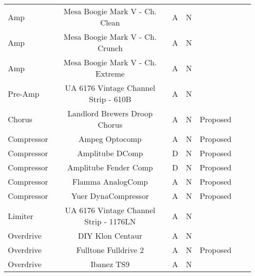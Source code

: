 \begin{table*}[]
{\begin{tabular}{lcccccc}
            Amp 
                & Mesa Boogie Mark V - Ch. Clean 
                & A 
                & N 
                & \cite{schmitz2018introducing} \\
            Amp 
                & Mesa Boogie Mark V - Ch. Crunch 
                & A 
                & N 
                & \cite{schmitz2018introducing} \\
            Amp 
                & Mesa Boogie Mark V - Ch. Extreme 
                & A 
                & N 
                & \cite{schmitz2018introducing} \\
            Pre-Amp 
                & UA 6176 Vintage Channel Strip - 610B 
                & A 
                & N 
                & \cite{martinez2020deep} \\
            \midrule
            Chorus 
                & Landlord Brewers Droop Chorus 
                & A 
                & N 
                & Proposed \\
            \midrule
            Compressor 
                & Ampeg Optocomp 
                & A 
                & N 
                & Proposed \\
            Compressor 
                & Amplitube DComp 
                & D 
                & N 
                & Proposed \\
            Compressor 
                & Amplitube Fender Comp 
                & D 
                & N 
                & Proposed \\
            Compressor 
                & Flamma AnalogComp 
                & A 
                & N 
                & Proposed \\
            Compressor 
                & Yuer DynaCompressor 
                & A 
                & N 
                & Proposed \\
            Limiter 
                & UA 6176 Vintage Channel Strip - 1176LN 
                & A 
                & N 
                & \cite{martinez2020deep} \\
            \midrule
            Overdrive 
                & DIY Klon Centaur 
                & A 
                & N 
                & \cite{guitarml} \\
            Overdrive 
                & Fulltone Fulldrive 2 
                & A 
                & N 
                & Proposed \\
            Overdrive 
                & Ibanez TS9 
                & A 
                & N 
                & \cite{guitarml} \\

\end{tabular}}
\end{table*}
